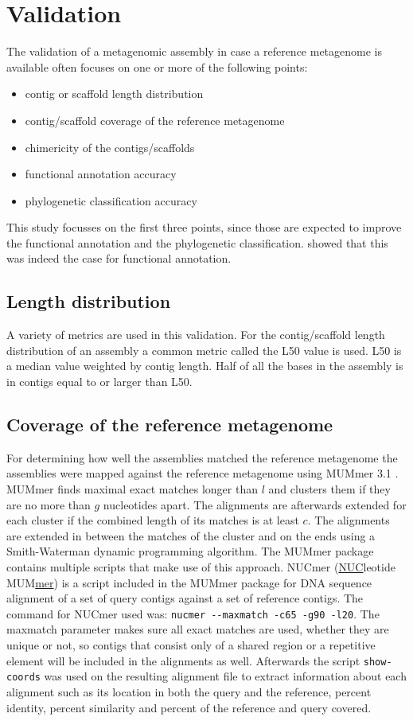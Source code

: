 \documentclass[a4paper,12pt]{report}
\begin{document}
\clearpage \section{Validation} \label{sec:metval} The validation of a metagenomic assembly in
case a reference metagenome is available often focuses on one or more of the
following points:
\begin{itemize}
\item contig or scaffold length distribution
\item contig/scaffold coverage of the reference metagenome
\item chimericity of the contigs/scaffolds
\item functional annotation accuracy
\item phylogenetic classification accuracy
\end{itemize}
This study focusses on the first three points, since those are expected to
improve the functional annotation and the phylogenetic classification.
\citet{Mende22384016} showed that this was indeed the case for functional
annotation.\\


\subsection{Length distribution}
A variety of metrics are used in this validation. For the contig/scaffold
length distribution of an assembly a common metric called the L50 value is
used. L50 is a median value weighted by contig length. Half of all the bases in
the assembly is in contigs equal to or larger than L50.


\subsection{Coverage of the reference metagenome}
\label{sec:cov}
For determining how well the assemblies matched the reference metagenome the
assemblies were mapped against the reference metagenome using MUMmer 3.1
\cite{Kurtz14759262}.  MUMmer finds maximal exact matches longer than $l$ and
clusters them if they are no more than $g$ nucleotides apart. The alignments
are afterwards extended for each cluster if the combined length of its matches
is at least $c$. The alignments are extended in between the matches of the
cluster and on the ends using a Smith-Waterman dynamic programming algorithm.
The MUMmer package contains multiple scripts that make use of this approach.
NUCmer (\underline{NUC}leotide MUM\underline{mer}) is a script included in the
MUMmer package for DNA sequence alignment of a set of query contigs against a
set of reference contigs. The command for NUCmer used was:
\verb!nucmer --maxmatch -c65 -g90 -l20!. The maxmatch parameter makes sure all
exact matches are used, whether they are unique or not, so contigs that consist
only of a shared region or a repetitive element will be included in the
alignments as well. Afterwards the script \verb!show-coords! was used on the
resulting alignment file to extract information about each alignment such as
its location in both the query and the reference, percent identity, percent
similarity and percent of the reference and query covered.\\
\end{document}
